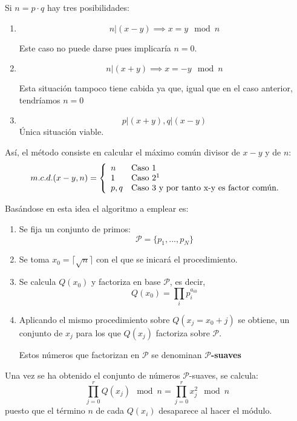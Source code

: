 \documentclass[nochap]{apuntesURJC}
\begin{document}
Si  $n=p\cdot q$ hay tres posibilidades:
\begin{enumerate}
\item
\[n|(x-y) \implies x=y \mod n\]

Este caso no puede darse pues implicaría $n=0$.

\item
\[n|(x+y) \implies x=-y \mod n\]

Esta situación tampoco tiene cabida ya que, igual que en el caso anterior, tendríamos $n=0$

\item
\[p|(x+y), q|(x-y)\]
Única situación viable.
\end{enumerate}

Así, el método consiste en calcular el máximo común divisor de $x-y$ y de $n$:
\[m.c.d.(x-y,n) = \left\{ \begin{array}{ll}
             n &   \text{Caso 1} \\
             1 &   \text{Caso 2}\footnotemark\\
             p,q & \text{Caso 3 y por tanto x-y es factor común.}
             \end{array}\right.\]


Basándose en esta idea el algoritmo a emplear es:

\begin{enumerate}
\item Se fija un conjunto de primos:
\[\mathcal{P} = \{p_1,...,p_N\}\]

\item Se toma $x_0=\lceil\sqrt{n}\rceil$ con el que se inicará el procedimiento.

\item Se calcula $Q(x_0)$ y factoriza en base $\mathcal{P}$, es decir,
\[Q(x_0) = \prod_i p_i^{a_{i0}}\]

\item Aplicando el mismo procedimiento sobre $Q(x_j=x_0+j)$ se obtiene, un conjunto de $x_j$ para los que $Q(x_j)$ factoriza sobre $\mathcal{P}$.

Estos números que factorizan en $\mathcal{P}$ se denominan \textbf{$\mathcal{P}$-suaves}
\end{enumerate}

Una vez se ha obtenido el conjunto de números $\mathcal{P}$-suaves, se calcula:
\[\prod_{j=0}^rQ(x_j) \mod n=\prod_{j=0}^rx_j^2 \mod n\]
puesto que el término $n$ de cada $Q(x_i)$ desaparece al hacer el módulo.
\end{document}
